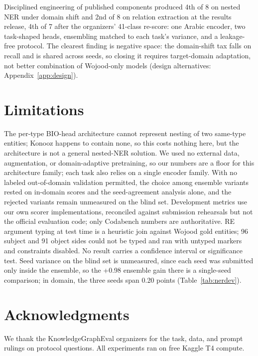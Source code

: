 \documentclass[11pt]{article}
\begin{document}
Disciplined engineering of published components produced 4th of 8 on
nested NER under domain shift and 2nd of 8 on relation extraction at
the results release, 4th of 7 after the organizers' 41-class re-score:
one Arabic encoder, two task-shaped heads,
ensembling matched to each task's variance, and a leakage-free protocol. The clearest
finding is negative space: the domain-shift tax falls on
recall and is shared across seeds, so closing it requires
target-domain adaptation, not better combination of Wojood-only
models (design alternatives: Appendix~\ref{app:design}).

\section{Limitations}

The per-type BIO-head architecture cannot represent nesting of two
same-type entities; Konooz happens to contain none, so this costs nothing
here, but the architecture is not a general nested-NER solution. We used
no external data, augmentation, or domain-adaptive pretraining, so our
numbers are a floor for this architecture family; each task also relies
on a single encoder family. With no labeled out-of-domain validation
permitted, the choice among ensemble variants rested on in-domain scores
and the seed-agreement analysis alone, and the rejected variants remain
unmeasured on the blind set. Development metrics use our own scorer
implementations, reconciled against submission rehearsals but not the
official evaluation code; only Codabench numbers are authoritative. RE
argument typing at test time is a heuristic join against Wojood gold
entities; 96 subject and 91 object sides could not be typed and ran with
untyped markers and constraints disabled. No result carries a confidence
interval or significance test. Seed variance on the blind set is
unmeasured, since each seed was submitted only inside the ensemble, so
the +0.98 ensemble gain there is a single-seed comparison; in domain, the
three seeds span 0.20 points (Table~\ref{tab:nerdev}).

\section*{Acknowledgments}

We thank the KnowledgeGraphEval organizers for the task, data, and prompt
rulings on protocol questions. All experiments ran on free Kaggle T4
compute.



\end{document}
